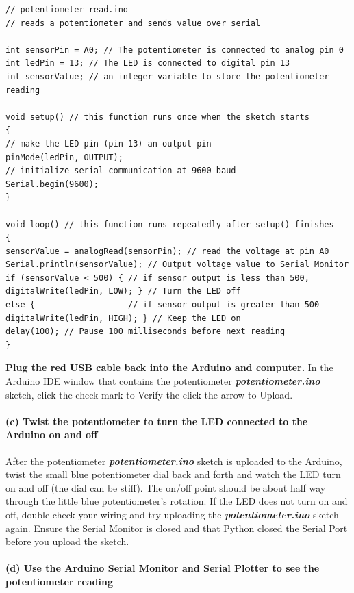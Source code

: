 \documentclass[11pt]{article}
\begin{document}
\begin{verbatim}
// potentiometer_read.ino
// reads a potentiometer and sends value over serial

int sensorPin = A0; // The potentiometer is connected to analog pin 0
int ledPin = 13; // The LED is connected to digital pin 13
int sensorValue; // an integer variable to store the potentiometer reading

void setup() // this function runs once when the sketch starts
{
// make the LED pin (pin 13) an output pin
pinMode(ledPin, OUTPUT);
// initialize serial communication at 9600 baud
Serial.begin(9600);
}

void loop() // this function runs repeatedly after setup() finishes
{
sensorValue = analogRead(sensorPin); // read the voltage at pin A0
Serial.println(sensorValue); // Output voltage value to Serial Monitor
if (sensorValue < 500) { // if sensor output is less than 500,
digitalWrite(ledPin, LOW); } // Turn the LED off
else {                   // if sensor output is greater than 500
digitalWrite(ledPin, HIGH); } // Keep the LED on
delay(100); // Pause 100 milliseconds before next reading
}
\end{verbatim}

\textbf{Plug the red USB cable back into the Arduino and computer.} In
the Arduino IDE window that contains the potentiometer
\textbf{\emph{potentiometer.ino}} sketch, click the check mark to Verify
the click the arrow to Upload.

    \hypertarget{c-twist-the-potentiometer-to-turn-the-led-connected-to-the-arduino-on-and-off}{%
\paragraph{(c) Twist the potentiometer to turn the LED connected to the
Arduino on and
off}\label{c-twist-the-potentiometer-to-turn-the-led-connected-to-the-arduino-on-and-off}}

After the potentiometer \textbf{\emph{potentiometer.ino}} sketch is
uploaded to the Arduino, twist the small blue potentiometer dial back
and forth and watch the LED turn on and off (the dial can be stiff). The
on/off point should be about half way through the little blue
potentiometer's rotation. If the LED does not turn on and off, double
check your wiring and try uploading the
\textbf{\emph{potentiometer.ino}} sketch again. Ensure the Serial
Monitor is closed and that Python closed the Serial Port before you
upload the sketch.

    \hypertarget{d-use-the-arduino-serial-monitor-and-serial-plotter-to-see-the-potentiometer-reading}{%
\paragraph{(d) Use the Arduino Serial Monitor and Serial Plotter to see
the potentiometer
reading}\label{d-use-the-arduino-serial-monitor-and-serial-plotter-to-see-the-potentiometer-reading}}
\end{document}

